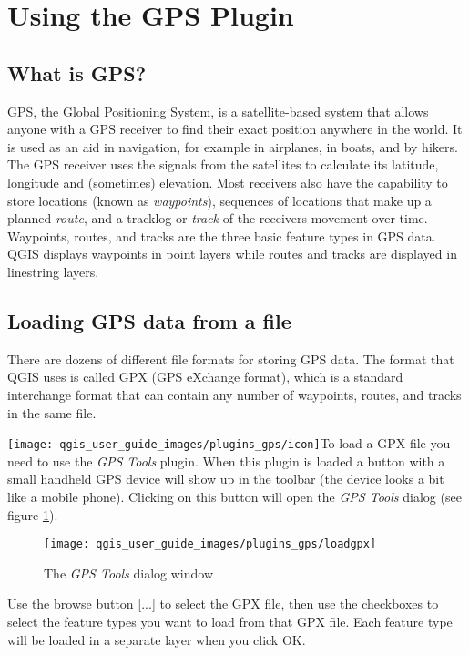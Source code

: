\section{Using the GPS Plugin}


\subsection{What is GPS?}

GPS, the Global Positioning System, is a satellite-based system that
allows anyone with a GPS receiver to find their exact position anywhere
in the world. It is used as an aid in navigation, for example in airplanes,
in boats, and by hikers. The GPS receiver uses the signals from the
satellites to calculate its latitude, longitude and (sometimes) elevation.
Most receivers also have the capability to store locations (known
as \emph{waypoints}), sequences of locations that make up a planned
\emph{route}, and a tracklog or \emph{track} of the receivers movement
over time. Waypoints, routes, and tracks are the three basic feature
types in GPS data. QGIS displays waypoints in point layers while routes
and tracks are displayed in linestring layers.


\subsection{Loading GPS data from a file}

There are dozens of different file formats for storing GPS data. The
format that QGIS uses is called GPX (GPS eXchange format), which is
a standard interchange format that can contain any number of waypoints,
routes, and tracks in the same file.

\texttt{[image: qgis\_user\_guide\_images/plugins\_gps/icon]}To load a GPX file you need to use the \emph{GPS Tools} plugin. When
this plugin is loaded a button with a small handheld GPS device will
show up in the toolbar (the device looks a bit like a mobile phone).
Clicking on this button will open the \emph{GPS Tools} dialog (see
figure \ref{figure GPX loader}).

%
\begin{figure}

\caption{\label{figure GPX loader}The \emph{GPS Tools} dialog window}

\texttt{[image: qgis\_user\_guide\_images/plugins\_gps/loadgpx]}
\end{figure}


Use the browse button {[}...{]} to select the GPX file, then use the
checkboxes to select the feature types you want to load from that
GPX file. Each feature type will be loaded in a separate layer when
you click OK.


